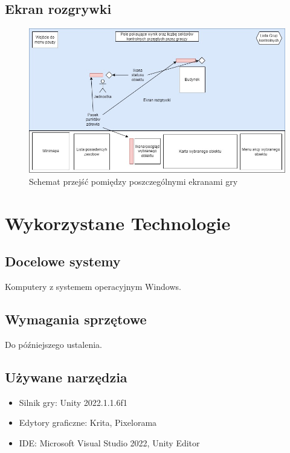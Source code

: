 \documentclass[a4paper]{scrreprt}
\begin{document}
\section{Ekran rozgrywki}
\begin{figure}[hb]
  \centering
  \includegraphics[width=1\textwidth]{mainScreenExample.jpg}
  \caption{\label{fig:schema2} Schemat przejść pomiędzy poszczególnymi ekranami gry}
\end{figure}



\chapter{Wykorzystane Technologie}

\section{Docelowe systemy}
Komputery z systemem operacyjnym Windows.

\section{Wymagania sprzętowe}
Do późniejszego ustalenia.

\section{Używane narzędzia}
\begin{itemize}
  \item Silnik gry: Unity 2022.1.1.6f1
  \item Edytory graficzne: Krita, Pixelorama
  \item IDE: Microsoft Visual Studio 2022, Unity Editor
\end{itemize}
\end{document}
